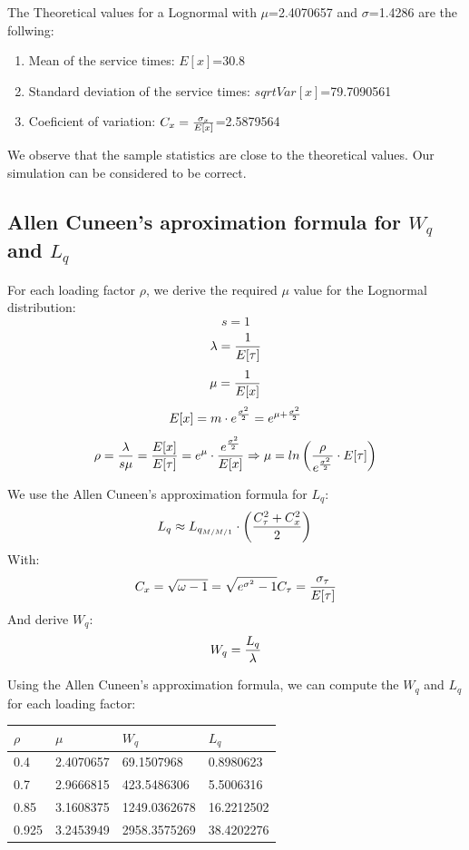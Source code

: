 \documentclass[]{article}
\providecommand{\tightlist}{%
  \setlength{\itemsep}{0pt}\setlength{\parskip}{0pt}}
\begin{document}
The Theoretical values for a Lognormal with \(\mu\)=2.4070657 and
\(\sigma\)=1.4286 are the follwing:

\begin{enumerate}
\def\labelenumi{\arabic{enumi}.}
\tightlist
\item
  Mean of the service times: \(E[x]\)=30.8
\item
  Standard deviation of the service times: \(sqrt{Var[x]}\)=79.7090561
\item
  Coeficient of variation: \(C_{x}={ \sigma_{x} \over E[x] }\)=2.5879564
\end{enumerate}

We observe that the sample statistics are close to the theoretical
values. Our simulation can be considered to be correct.

\subsection{\texorpdfstring{Allen Cuneen's aproximation formula for
\(W_{q}\) and
\(L_{q}\)}{Allen Cuneen's aproximation formula for W\_\{q\} and L\_\{q\}}}\label{allen-cuneens-aproximation-formula-for-w_q-and-l_q}

For each loading factor \(\rho\), we derive the required \(\mu\) value
for the Lognormal distribution: \[  s = 1 \]
\[  \lambda = { 1 \over E[\tau] } \] \[  \mu = {1 \over E[x]} \]
\[  E[x] = m \cdot e^{\sigma^{2} \over 2} = e^{\mu + {\sigma^{2} \over 2} }\]
\[  \rho = { \lambda \over {s\mu}} = { E[x] \over E[\tau] } = e^{\mu} \cdot { e^{\sigma^{2} \over 2} \over E[x] } \Rightarrow \mu = ln \left( { \rho \over e^{ \sigma^{2} \over 2 } } \cdot E[\tau]  \right) \]

We use the Allen Cuneen's approximation formula for \(L_{q}\): \[
  L_{q} \approx L_{q_{M/M/1}} \cdot \left( C_{\tau}^{2} + C_{x}^{2} \over 2  \right) \\
\] With: \[
C_{x} = \sqrt{ \omega - 1} =  \sqrt{ e^{\sigma^{2}} - 1} \\
C_{\tau} = { \sigma_{\tau} \over E[\tau] }
\] And derive \(W_{q}\): \[
  W_{q} = { L_{q} \over \lambda }
\]

Using the Allen Cuneen's approximation formula, we can compute the
\(W_{q}\) and \(L_{q}\) for each loading factor:

\begin{longtable}[]{@{}llll@{}}
\toprule
\(\rho\) & \(\mu\) & \(W_{q}\) & \(L_{q}\)\tabularnewline
\midrule
\endhead
0.4 & 2.4070657 & 69.1507968 & 0.8980623\tabularnewline
0.7 & 2.9666815 & 423.5486306 & 5.5006316\tabularnewline
0.85 & 3.1608375 & 1249.0362678 & 16.2212502\tabularnewline
0.925 & 3.2453949 & 2958.3575269 & 38.4202276\tabularnewline
\bottomrule
\end{longtable}
\end{document}
